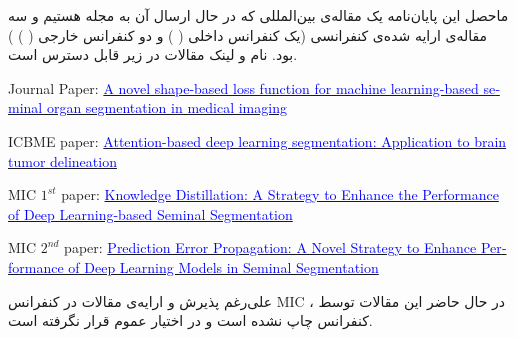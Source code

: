 

ماحصل این پایان‌نامه یک مقاله‌ی بین‌المللی که در حال ارسال آن به مجله هستیم و سه مقاله‌ی ارایه شده‌ی کنفرانسی (یک کنفرانس داخلی 
( )
و دو کنفرانس خارجی
( )
)
بود. نام و لینک مقالات در زیر قابل دسترس است.

\begin{latin}
	
Journal Paper: \href{https://arxiv.org/ftp/arxiv/papers/2203/2203.03336.pdf}{\textcolor{blue}{A novel shape-based loss function for machine learning-based seminal organ segmentation in medical imaging}}

ICBME paper: \href{https://ieeexplore.ieee.org/abstract/document/9750374}{\textcolor{blue}{Attention-based deep learning segmentation: Application to brain tumor delineation}}

MIC $1^{st}$ paper:  \href{https://nssmic.ieee.org/2021/}{\textcolor{blue}{Knowledge Distillation: A Strategy to Enhance
		the Performance of Deep Learning-based Seminal
		Segmentation}}

MIC $2^{nd}$ paper: \href{https://nssmic.ieee.org/2021/}{\textcolor{blue}{Prediction Error Propagation: A Novel Strategy to Enhance Performance of Deep Learning Models in Seminal Segmentation}}
\end{latin}

علی‌رغم پذیرش و ارایه‌ی مقالات در کنفرانس MIC ، در حال حاضر این مقالات توسط کنفرانس چاپ نشده است و در اختیار عموم قرار نگرفته است.


